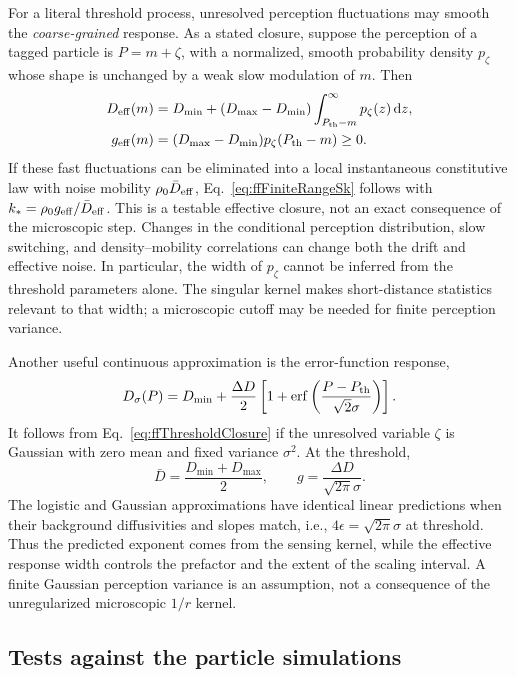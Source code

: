 \documentclass{article}
\begin{document}
For a literal threshold process, unresolved perception fluctuations may smooth the \emph{coarse-grained} response. As a stated closure, suppose the perception of a tagged particle is $P=m+\zeta$, with a normalized, smooth probability density $p_\zeta$ whose shape is unchanged by a weak slow modulation of $m$. Then
\begin{align}
    D_{\rm eff}(m)&=D_{\min}+(D_{\max}-D_{\min})
    \int_{P_{\rm th}-m}^{\infty}p_\zeta(z)\,\mathrm dz,\\
    g_{\rm eff}(m)&=(D_{\max}-D_{\min})p_\zeta(P_{\rm th}-m)\geq0.
    \label{eq:ffThresholdClosure}
\end{align}
If these fast fluctuations can be eliminated into a local instantaneous constitutive law with noise mobility $\rho_0\bar D_{\rm eff}$, Eq.~\eqref{eq:ffFiniteRangeSk} follows with $k_* =\rho_0g_{\rm eff}/\bar D_{\rm eff}$. This is a testable effective closure, not an exact consequence of the microscopic step. Changes in the conditional perception distribution, slow switching, and density--mobility correlations can change both the drift and effective noise. In particular, the width of $p_\zeta$ cannot be inferred from the threshold parameters alone. The singular kernel makes short-distance statistics relevant to that width; a microscopic cutoff may be needed for finite perception variance.

Another useful continuous approximation is the error-function response,
\begin{equation}
    D_\sigma(P)=D_{\min}+\frac{\Delta D}{2}
    \left[1+\operatorname{erf}\left(\frac{P-P_{\rm th}}{\sqrt{2}\sigma}\right)\right].
\end{equation}
It follows from Eq.~\eqref{eq:ffThresholdClosure} if the unresolved variable $\zeta$ is Gaussian with zero mean and fixed variance $\sigma^2$. At the threshold,
\begin{equation}
    \bar D=\frac{D_{\min}+D_{\max}}2,\qquad
    g=\frac{\Delta D}{\sqrt{2\pi}\sigma}.
\end{equation}
The logistic and Gaussian approximations have identical linear predictions when their background diffusivities and slopes match, i.e., $4\epsilon=\sqrt{2\pi}\sigma$ at threshold. Thus the predicted exponent comes from the sensing kernel, while the effective response width controls the prefactor and the extent of the scaling interval. A finite Gaussian perception variance is an assumption, not a consequence of the unregularized microscopic $1/r$ kernel.

\subsection{Tests against the particle simulations}
\end{document}
